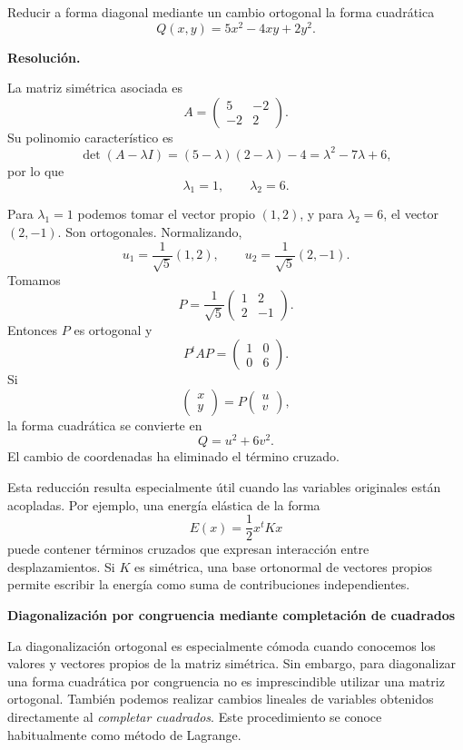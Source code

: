 \begin{solvedexercise}
Reducir a forma diagonal mediante un cambio ortogonal la forma cuadrática
\[
Q(x,y)=5x^2-4xy+2y^2.
\]

\textbf{Resolución.}\par\smallskip
La matriz simétrica asociada es
\[
A=\begin{pmatrix}
5&-2\\
-2&2
\end{pmatrix}.
\]
Su polinomio característico es
\[
\det(A-\lambda I)
=(5-\lambda)(2-\lambda)-4
=\lambda^2-7\lambda+6,
\]
por lo que
\[
\lambda_1=1,
\qquad
\lambda_2=6.
\]

Para $\lambda_1=1$ podemos tomar el vector propio $(1,2)$, y para $\lambda_2=6$, el vector $(2,-1)$. Son ortogonales. Normalizando,
\[
u_1=\frac1{\sqrt5}(1,2),
\qquad
u_2=\frac1{\sqrt5}(2,-1).
\]
Tomamos
\[
P=\frac1{\sqrt5}
\begin{pmatrix}
1&2\\
2&-1
\end{pmatrix}.
\]
Entonces $P$ es ortogonal y
\[
P^tAP=
\begin{pmatrix}
1&0\\
0&6
\end{pmatrix}.
\]
Si
\[
\begin{pmatrix}x\\y\end{pmatrix}
=P\begin{pmatrix}u\\v\end{pmatrix},
\]
la forma cuadrática se convierte en
\[
\boxed{Q=u^2+6v^2.}
\]
El cambio de coordenadas ha eliminado el término cruzado.
\end{solvedexercise}

Esta reducción resulta especialmente útil cuando las variables originales están acopladas. Por ejemplo, una energía elástica de la forma
\[
E(x)=\frac12x^tKx
\]
puede contener términos cruzados que expresan interacción entre desplazamientos. Si $K$ es simétrica, una base ortonormal de vectores propios permite escribir la energía como suma de contribuciones independientes.

\textbf{Diagonalización por congruencia mediante completación de cuadrados}

La diagonalización ortogonal es especialmente cómoda cuando conocemos los valores y vectores propios de la matriz simétrica. Sin embargo, para diagonalizar una forma cuadrática por congruencia no es imprescindible utilizar una matriz ortogonal. También podemos realizar cambios lineales de variables obtenidos directamente al \emph{completar cuadrados}. Este procedimiento se conoce habitualmente como método de Lagrange.


